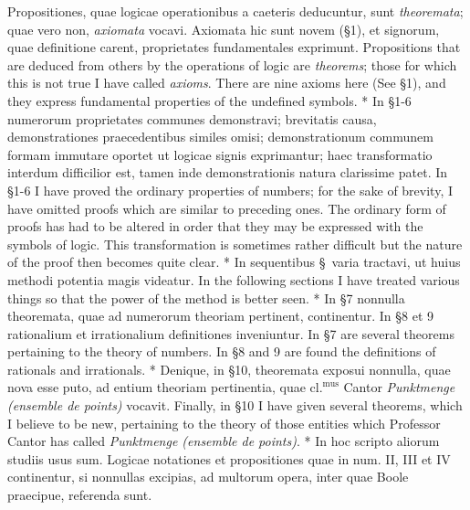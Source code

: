 \documentclass{book}
\newenvironment{translateTwoCol}
               { %
                 \columnratio{0.5, 0.5} \begin{paracol}{2}
                 \newcommand{\LAT}{\switchcolumn[0]*}
                 \newcommand{\ENG}{\switchcolumn[1]}
               }
               { %
                 \let\ENG\undefined
                 \let\LAT\undefined
                 \end{paracol}
               }
\begin{document}
\begin{translateTwoCol}
Propositiones, quae logicae operationibus a caeteris deducuntur, sunt \emph{theoremata}; quae vero non, \emph{axiomata} vocavi. Axiomata hic sunt novem (\S 1), et signorum, quae definitione carent, proprietates fundamentales exprimunt.
\ENG
Propositions that are deduced from others by the operations of logic are \emph{theorems}; those for which this is not true I have called \emph{axioms}. There are nine axioms here (See \S 1), and they express fundamental properties of the undefined symbols.
\LAT
In \S 1-6 numerorum proprietates communes demonstravi; brevitatis causa, demonstrationes praecedentibus similes omisi; demonstrationum communem formam immutare oportet ut logicae signis exprimantur; haec transformatio interdum difficilior est, tamen inde demonstrationis natura clarissime patet.
\ENG
In \S 1-6 I have proved the ordinary properties of numbers; for the sake of brevity, I have omitted proofs which are similar to preceding ones. The ordinary form of proofs has had to be altered in order that they may be expressed with the symbols of logic. This transformation is sometimes rather difficult but the nature of the proof then becomes quite clear. 
\LAT
In sequentibus \S \ varia tractavi, ut huius methodi potentia magis videatur.
\ENG
In the following sections I have treated various things so that the power of the method is better seen.
\LAT
In \S 7 nonnulla theoremata, quae ad numerorum theoriam pertinent, continentur. In \S 8 et 9 rationalium et irrationalium definitiones inveniuntur.
\ENG
In \S 7 are several theorems pertaining to the theory of numbers. In \S 8 and 9 are found the definitions of rationals and irrationals.
\LAT
Denique, in \S 10, theoremata exposui nonnulla, quae nova esse puto, ad entium theoriam pertinentia, quae $\text{cl.}^{\text{mus}}$ Cantor \emph{Punktmenge (ensemble de points)} vocavit.
\ENG
Finally, in \S 10 I have given several theorems, which I believe to be new, pertaining to the theory of those entities which Professor Cantor has called \emph{Punktmenge (ensemble de points)}.
\LAT
In hoc scripto aliorum studiis usus sum. Logicae notationes et propositiones quae in num. II, III et IV continentur, si nonnullas excipias, ad multorum opera, inter quae Boole praecipue, referenda sunt.
\end{translateTwoCol}
\end{document}
